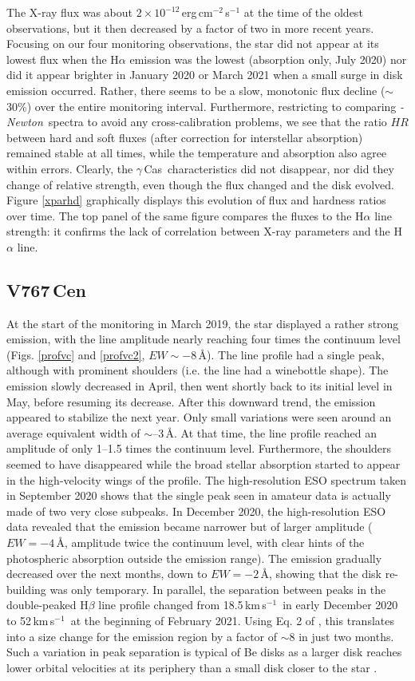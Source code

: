 \documentclass[a4paper,fleqn,usenatbib]{mnras}
\newcommand{\xmm}{{\sc{XMM}}\emph{-Newton}}
\newcommand{\gc}{$\gamma$\,Cas}
\newcommand{\vc}{V767\,Cen}
\newcommand{\kms}{km\,s$^{-1}$}
\begin{document}
The X-ray flux was about $2\times10^{-12}$\,erg\,cm$^{-2}$\,s$^{-1}$ at the time of the oldest observations, but it then decreased by a factor of two in more recent years. Focusing on our four monitoring observations, the star did not appear at its lowest flux when the H$\alpha$ emission was the lowest (absorption only, July 2020) nor did it appear brighter in January 2020 or March 2021 when a small surge in disk emission occurred. Rather, there seems to be a slow, monotonic flux decline ($\sim$30\%) over the entire monitoring interval. Furthermore, restricting to comparing \xmm\ spectra to avoid any cross-calibration problems, we see that the ratio $HR$ between hard and soft fluxes (after correction for interstellar absorption) remained stable at all times, while the temperature and absorption also agree within errors. Clearly, the \gc\ characteristics did not disappear, nor did they change of relative strength, even though the flux changed and the disk evolved. Figure \ref{xparhd} graphically displays this evolution of flux and hardness ratios over time. The top panel of the same figure compares the fluxes to the H$\alpha$ line strength: it confirms the lack of correlation between X-ray parameters and the H$\alpha$ line.
 
\subsection{\vc}
At the start of the monitoring in March 2019, the star displayed a rather strong emission, with the line amplitude nearly reaching four times the continuum level (Figs. \ref{profvc} and \ref{profvc2}, $EW\sim-8$\,\AA). The line profile had a single peak, although with prominent shoulders (i.e. the line had a winebottle shape). The emission slowly decreased in April, then went shortly back to its initial level in May, before resuming its decrease. After this downward trend, the emission appeared to stabilize the next year. Only small variations were seen around an average equivalent width of $\sim$--3\,\AA. At that time, the line profile reached an amplitude of only 1--1.5 times the continuum level. Furthermore, the shoulders seemed to have disappeared while the broad stellar absorption started to appear in the high-velocity wings of the profile. The high-resolution ESO spectrum taken in September 2020 shows that the single peak seen in amateur data is actually made of two very close subpeaks. In December 2020, the high-resolution ESO data revealed that the emission became narrower but of larger amplitude ($EW=-4$\,\AA, amplitude twice the continuum level, with clear hints of the photospheric absorption outside the emission range). The emission gradually decreased over the next months, down to $EW=-2$\,\AA, showing that the disk re-building was only temporary. In parallel, the separation between peaks in the double-peaked H$\beta$ line profile changed from 18.5\,\kms\ in early December 2020 to 52\,\kms\ at the beginning of February 2021. Using Eq. 2 of \citet{zam19}, this translates into a size change for the emission region by a factor of $\sim$8 in just two months. Such a variation in peak separation is typical of Be disks as a larger disk reaches lower orbital velocities at its periphery than a small disk closer to the star \citep{hum95,zam19}.
\end{document}
